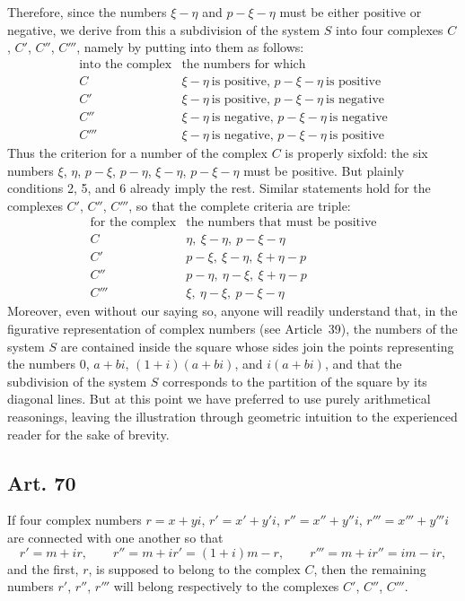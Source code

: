 \documentclass[12pt]{article}
\newcommand{\art}[1]{\subsection*{Art. #1}}
\begin{document}
Therefore, since the numbers $\xi-\eta$ and $p-\xi-\eta$ must be either positive or negative, we derive from this a subdivision of the system $S$ into four complexes $C$, $C'$, $C''$, $C'''$, namely by putting into them as follows:
\[
\begin{array}{c|l}
\text{into the complex} & \text{the numbers for which}\\
\hline
C & \xi-\eta\ \text{is positive, } p-\xi-\eta\ \text{is positive}\\
C' & \xi-\eta\ \text{is positive, } p-\xi-\eta\ \text{is negative}\\
C'' & \xi-\eta\ \text{is negative, } p-\xi-\eta\ \text{is negative}\\
C''' & \xi-\eta\ \text{is negative, } p-\xi-\eta\ \text{is positive}
\end{array}
\]
Thus the criterion for a number of the complex $C$ is properly sixfold: the six numbers $\xi$, $\eta$, $p-\xi$, $p-\eta$, $\xi-\eta$, $p-\xi-\eta$ must be positive. But plainly conditions 2, 5, and 6 already imply the rest. Similar statements hold for the complexes $C'$, $C''$, $C'''$, so that the complete criteria are triple:
\[
\begin{array}{c|l}
\text{for the complex} & \text{the numbers that must be positive}\\
\hline
C & \eta,\ \xi-\eta,\ p-\xi-\eta\\
C' & p-\xi,\ \xi-\eta,\ \xi+\eta-p\\
C'' & p-\eta,\ \eta-\xi,\ \xi+\eta-p\\
C''' & \xi,\ \eta-\xi,\ p-\xi-\eta
\end{array}
\]
Moreover, even without our saying so, anyone will readily understand that, in the figurative representation of complex numbers (see Article~39), the numbers of the system $S$ are contained inside the square whose sides join the points representing the numbers $0$, $a+bi$, $(1+i)(a+bi)$, and $i(a+bi)$, and that the subdivision of the system $S$ corresponds to the partition of the square by its diagonal lines. But at this point we have preferred to use purely arithmetical reasonings, leaving the illustration through geometric intuition to the experienced reader for the sake of brevity.

\art{70}
If four complex numbers $r=x+yi$, $r'=x'+y'i$, $r''=x''+y''i$, $r'''=x'''+y'''i$ are connected with one another so that
\[
r'=m+ir,\qquad r''=m+ir'=(1+i)m-r,\qquad
r'''=m+ir''=im-ir,
\]
and the first, $r$, is supposed to belong to the complex $C$, then the remaining numbers $r'$, $r''$, $r'''$ will belong respectively to the complexes $C'$, $C''$, $C'''$.
\end{document}
